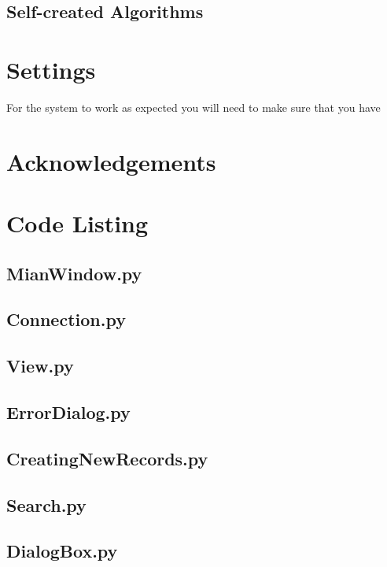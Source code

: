 \subsection{Self-created Algorithms}

\section{Settings}
For the system to work as expected you will need to make sure that you have 
\section{Acknowledgements}

\section{Code Listing}

\subsection{MianWindow.py}

\subsection{Connection.py}

\subsection{View.py}

\subsection{ErrorDialog.py}

\subsection{CreatingNewRecords.py}

\subsection{Search.py}

\subsection{DialogBox.py}

